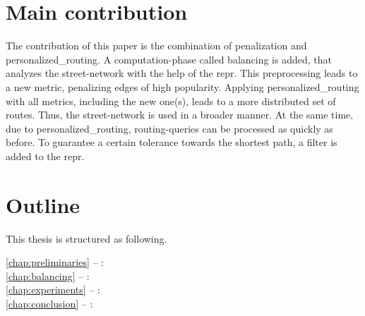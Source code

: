 \section{Main contribution}

    The contribution of this paper is the combination of penalization and \gls{personalized_routing}.
    A computation-phase called \gls{balancing} is added, that analyzes the street-network with the help of the \gls{repr}.
    This preprocessing leads to a new \gls{metric}, penalizing edges of high popularity.
    Applying \gls{personalized_routing} with all \glspl{metric}, including the new one(s), leads to a more distributed set of routes.
    Thus, the street-network is used in a broader manner.
    At the same time, due to \gls{personalized_routing}, routing-queries can be processed as quickly as before.
    To guarantee a certain tolerance towards the shortest path, a filter is added to the \gls{repr}.

\section{Outline}

    This thesis is structured as following.
    \begin{description}
        \item[\cref{chap:preliminaries} -- :]
        \item[\cref{chap:balancing} -- :]
        \item[\cref{chap:experiments} -- :]
        \item[\cref{chap:conclusion} -- :]
    \end{description}